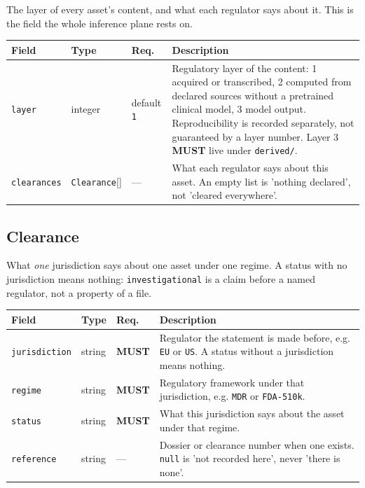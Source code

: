 \documentclass[11pt,a4paper]{article}
\newcommand{\MUST}{\textcolor{uosred}{\textbf{MUST}}}
\newcommand{\code}[1]{\texttt{\small #1}}
\begin{document}
The layer of every asset's content, and what each regulator says about it. This is the field the whole inference plane rests on.

\begin{longtable}{L{3.5cm} L{3.0cm} C{1.4cm} L{6.4cm}}
\toprule
\textbf{Field} & \textbf{Type} & \textbf{Req.} & \textbf{Description}\\
\midrule
\endhead
\code{layer} & integer & default \code{1} & Regulatory layer of the content: 1 acquired or transcribed, 2 computed from declared sources without a pretrained clinical model, 3 model output. Reproducibility is recorded separately, not guaranteed by a layer number. Layer 3 \MUST{} live under \code{derived/}.\\
\code{clearances} & \code{Clearance}[] & --- & What each regulator says about this asset. An empty list is 'nothing declared', not 'cleared everywhere'.\\
\bottomrule
\end{longtable}

\subsection{Clearance}

What \emph{one} jurisdiction says about one asset under one regime. A status with no jurisdiction means nothing: \code{investigational} is a claim before a named regulator, not a property of a file.

\begin{longtable}{L{3.5cm} L{3.0cm} C{1.4cm} L{6.4cm}}
\toprule
\textbf{Field} & \textbf{Type} & \textbf{Req.} & \textbf{Description}\\
\midrule
\endhead
\code{jurisdiction} & string & \MUST{} & Regulator the statement is made before, e.g. \code{EU} or \code{US}. A status without a jurisdiction means nothing.\\
\code{regime} & string & \MUST{} & Regulatory framework under that jurisdiction, e.g. \code{MDR} or \code{FDA-510k}.\\
\code{status} & string & \MUST{} & What this jurisdiction says about the asset under that regime.\\
\code{reference} & string & --- & Dossier or clearance number when one exists. \code{null} is 'not recorded here', never 'there is none'.\\
\bottomrule
\end{longtable}
\end{document}
